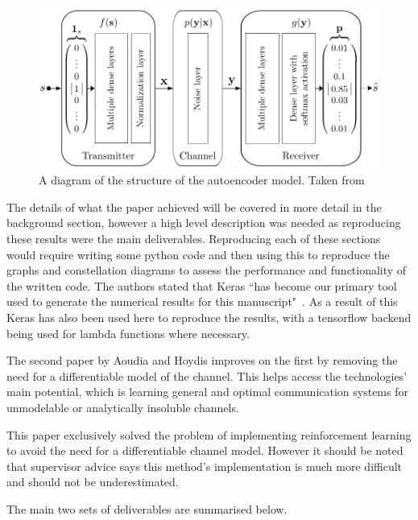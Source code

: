 \documentclass[12pt,onecolumn,letterpaper]{article}
\newcommand\genfigsize{0.5}
\begin{document}
\begin{figure}[t]
   \centering
   \includegraphics[width=\genfigsize\linewidth]{figures/oShea_autoencoder_layout.PNG}
   \caption{A diagram of the structure of the autoencoder model. Taken from~\cite{oShea}}
   \label{fig:oSheaAutoencoderLayout}
\end{figure}

The details of what the paper achieved will be covered in more detail in the background section, however a high level description was needed as reproducing these results were the main deliverables. Reproducing each of these sections would require writing some python code and then using this to reproduce the graphs and constellation diagrams to assess the performance and functionality of the written code. The authors stated that Keras ``has become our primary tool used to generate the numerical results for this manuscript"~\cite{oShea}. As a result of this Keras has also been used here to reproduce the results, with a tensorflow backend being used for lambda functions where necessary.

The second paper by Aoudia and Hoydis improves on the first by removing the need for a differentiable model of the channel. This helps access the technologies' main potential, which is learning general and optimal communication systems for unmodelable or analytically insoluble channels. 

This paper exclusively solved the problem of implementing reinforcement learning to avoid the need for a differentiable channel model. However it should be noted that supervisor advice says this method's implementation is much more difficult and should not be underestimated.

The main two sets of deliverables are summarised below.
\end{document}
